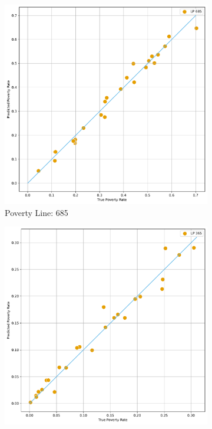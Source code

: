     \begin{figure}[H]
        \caption{Correlation: Predicted Poverty against true by Region (WB Version)}
        \centering
             \centering
             \begin{subfigure}[b]{0.47\textwidth}
                 \centering
                 \includegraphics[width=\textwidth]{../figures/baseline_report/fig4_2_prediction_vs_true_poverty_rate_regions_p685_scatter.pdf}
                 \caption{Poverty Line: 685}
             \end{subfigure}
             \hfill
             \begin{subfigure}[b]{0.47\textwidth}
                 \centering
                 \includegraphics[width=\textwidth]{../figures/baseline_report/fig4_2_prediction_vs_true_poverty_rate_regions_p365_scatter.pdf}

\end{subfigure}
\end{figure}
